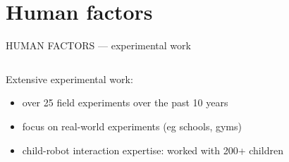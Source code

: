 \documentclass[xcolor=table]{beamer}
\begin{document}

\section*{Human factors}

{
\begin{frame}{HUMAN FACTORS --- experimental work}

    \begin{columns}
        \begin{column}{0.4\linewidth}

    Extensive experimental work:

    \begin{itemize}
        \item over 25 field experiments over the past 10 years
        \item focus on real-world experiments (eg schools, gyms) 
        \item child-robot interaction expertise: worked with 200+ children
    \end{itemize}

    \end{column}
        \begin{column}{0.6\linewidth}
    \end{column}
    \end{columns}
\end{frame}
}
\end{document}
